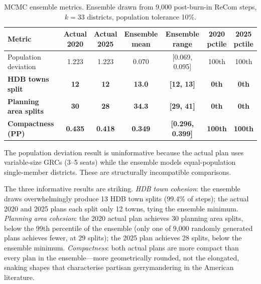 \documentclass[12pt]{article}
\begin{document}
\begin{table}[h]
\centering
\caption{MCMC ensemble metrics. Ensemble drawn from 9,000 post-burn-in ReCom steps, $k=33$
districts, population tolerance 10\%.}
\label{tab:mcmc}
\begin{adjustbox}{max width=\textwidth}
\small
\begin{tabular}{lcccccc}
\toprule
Metric & \makecell{Actual\\2020} & \makecell{Actual\\2025} & \makecell{Ensemble\\mean} & \makecell{Ensemble\\range}
  & \makecell{2020\\pctile} & \makecell{2025\\pctile} \\
\midrule
Population deviation  & 1.223 & 1.223 & 0.070 & {[}0.069, 0.095{]} & 100th & 100th \\
\textbf{HDB towns split} & \textbf{12} & \textbf{12} & \textbf{13.0}
  & \textbf{{[}12, 13{]}} & \textbf{0th} & \textbf{0th} \\
\textbf{Planning area splits} & \textbf{30} & \textbf{28} & \textbf{34.3}
  & \textbf{{[}29, 41{]}} & \textbf{0th} & \textbf{0th} \\
\textbf{Compactness (PP)}    & \textbf{0.435} & \textbf{0.418} & \textbf{0.349}
  & \textbf{{[}0.296, 0.399{]}} & \textbf{100th} & \textbf{100th} \\
\bottomrule
\end{tabular}
\end{adjustbox}
\end{table}

The population deviation result is uninformative because the actual plan uses variable-size GRCs
(3--5 seats) while the ensemble models equal-population single-member districts. These are
structurally incompatible comparisons.

The three informative results are striking. \textit{HDB town cohesion}: the ensemble draws
overwhelmingly produce 13 HDB town splits (99.4\% of steps); the actual 2020 and 2025 plans
each split only 12 towns, tying the ensemble minimum. \textit{Planning area cohesion}: the 2020
actual plan achieves 30 planning area splits, below the 99th percentile of the ensemble (only
one of 9,000 randomly generated plans achieves fewer, at 29 splits); the 2025 plan achieves 28
splits, below the ensemble minimum. \textit{Compactness}: both actual plans are more compact than
every plan in the ensemble---more geometrically rounded, not the elongated, snaking shapes that
characterise partisan gerrymandering in the American literature.
\end{document}
